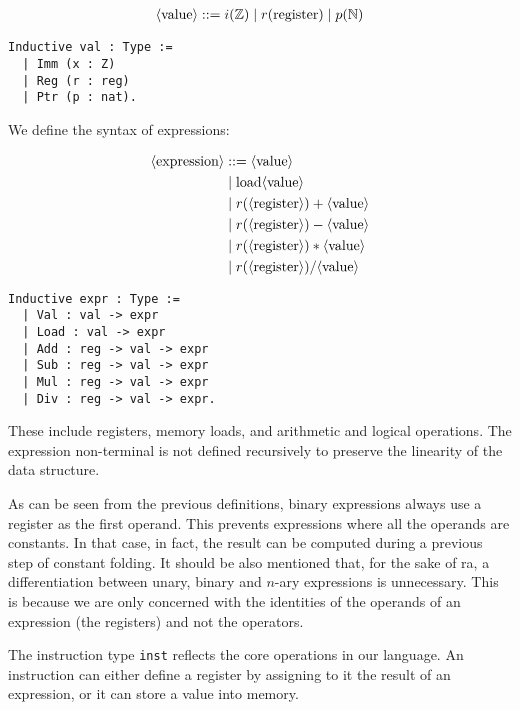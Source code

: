 \begin{align*}
\langle\text{value}\rangle ::= i( \mathbb Z ) \mid r( \text{register} ) \mid p( \mathbb N )
\end{align*}

\begin{lstlisting}[style=Rocq]
Inductive val : Type :=
  | Imm (x : Z)
  | Reg (r : reg)
  | Ptr (p : nat).
\end{lstlisting}

We define the syntax of expressions:

\begin{minipage}{0.45\textwidth}
\begin{align*}
\langle\text{expression}\rangle &::= \langle\text{value}\rangle \\
&\mid \text{load} \langle\text{value}\rangle \\
&\mid r( \langle\text{register}\rangle) + \langle\text{value}\rangle \\
&\mid r( \langle\text{register}\rangle) - \langle\text{value}\rangle \\
&\mid r( \langle\text{register}\rangle) * \langle\text{value}\rangle \\
&\mid r( \langle\text{register}\rangle) / \langle\text{value}\rangle \\
\end{align*}
\end{minipage}
\hfill
\begin{minipage}{0.45\textwidth}
\begin{lstlisting}[style=Rocq]
Inductive expr : Type :=
  | Val : val -> expr
  | Load : val -> expr
  | Add : reg -> val -> expr
  | Sub : reg -> val -> expr
  | Mul : reg -> val -> expr
  | Div : reg -> val -> expr.
\end{lstlisting}
\end{minipage}

These include registers, memory loads, and arithmetic and logical operations. The expression non-terminal is not defined recursively to preserve the linearity of the data structure.

As can be seen from the previous definitions, binary expressions always use a register as the first operand. This prevents expressions where all the operands are constants. In that case, in fact, the result can be computed during a previous step of constant folding. It should be also mentioned that, for the sake of \gls{ra}, a differentiation between unary, binary and $n$-ary expressions is unnecessary. This is because we are only concerned with the identities of the operands of an expression (the registers) and not the operators.

The instruction type \texttt{inst} reflects the core operations in our language. An instruction can either define a register by assigning to it the result of an expression, or it can store a value into memory.

